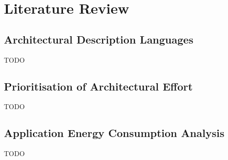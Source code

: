 \chapter{Literature Review}

\section{Architectural Description Languages}
\label{sec:adl-lit-review}

TODO

\section{Prioritisation of Architectural Effort}

TODO

\section{Application Energy Consumption Analysis}

TODO
